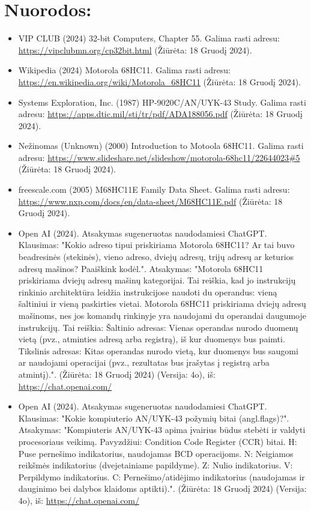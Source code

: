 \documentclass[a4paper,12pt]{article}
\begin{document}
\section{Nuorodos:}
\begin{itemize}
    \item VIP CLUB (2024) 32-bit Computers, Chapter 55. Galima rasti adresu: \url{https://vipclubmn.org/cp32bit.html} (Žiūrėta: 18 Gruodį 2024).
    \item Wikipedia (2024) Motorola 68HC11. Galima rasti adresu: \url{https://en.wikipedia.org/wiki/Motorola_68HC11} (Žiūrėta: 18 Gruodį 2024).
    \item Systems Exploration, Inc. (1987) HP-9020C/AN/UYK-43 Study. Galima rasti adresu: \url{https://apps.dtic.mil/sti/tr/pdf/ADA188056.pdf} (Žiūrėta: 18 Gruodį 2024).
    \item Nežinomas (Unknown) (2000) Introduction to Motoola 68HC11. Galima rasti adresu: \url{https://www.slideshare.net/slideshow/motorola-68hc11/22644023#5} (Žiūrėta: 18 Gruodį 2024).
    \item freescale.com (2005) M68HC11E Family Data Sheet. Galima rasti adresu: \url{https://www.nxp.com/docs/en/data-sheet/M68HC11E.pdf} (Žiūrėta: 18 Gruodį 2024).
    \item Open AI (2024). Atsakymas sugeneruotas naudodamiesi ChatGPT. Klausimas: "Kokio adreso tipui priskiriama Motorola 68HC11? Ar tai buvo beadresinės (stekinės), vieno adreso, dviejų adresų,  trijų adresų ar keturios adresų mašinos? Paaiškink kodėl.". Atsakymas: "Motorola 68HC11 priskiriama dviejų adresų mašinų kategorijai. Tai reiškia, kad jo instrukcijų rinkinio architektūra leidžia instrukcijose naudoti du operandus: vieną šaltiniui ir vieną paskirties vietai. Motorola 68HC11 priskiriama dviejų adresų mašinoms, nes jos komandų rinkinyje yra naudojami du operandai daugumoje instrukcijų. Tai reiškia: Šaltinio adresas: Vienas operandas nurodo duomenų vietą (pvz., atminties adresą arba registrą), iš kur duomenys bus paimti. Tikslinis adresas: Kitas operandas nurodo vietą, kur duomenys bus saugomi ar naudojami operacijai (pvz., rezultatas bus įrašytas į registrą arba atmintį).". (Žiūrėta: 18 Gruodį 2024) (Versija: 4o), iš: \url{https://chat.openai.com/}
    \item Open AI (2024). Atsakymas sugeneruotas naudodamiesi ChatGPT. Klausimas: "Kokie kompiuterio AN/UYK-43 požymių bitai (angl.flags)?". Atsakymas: "Kompiuteris AN/UYK-43 apima įvairius būdus stebėti ir valdyti procesoriaus veikimą. Pavyzdžiui: Condition Code Register (CCR) bitai. H: Puse pernešimo indikatorius, naudojamas BCD operacijoms. N: Neigiamos reikšmės indikatorius (dvejetainiame papildyme). Z: Nulio indikatorius. V: Perpildymo indikatorius. C: Pernešimo/atidėjimo indikatorius (naudojamas ir dauginimo bei dalybos klaidoms aptikti).". (Žiūrėta: 18 Gruodį 2024) (Versija: 4o), iš: \url{https://chat.openai.com/}

\end{itemize}
\end{document}
